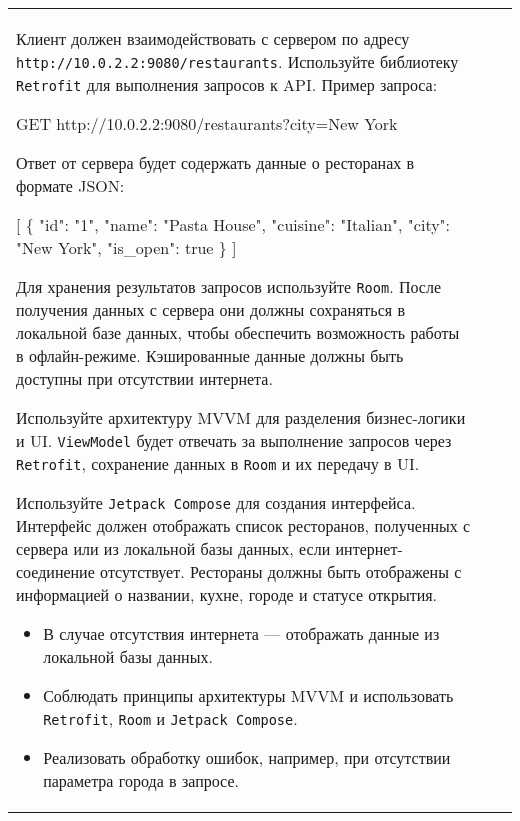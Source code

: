 \documentclass[a4paper]{article}
\begin{document}
\begin{tabular}{!{\vrule width 2pt}p{5cm}|p{6cm}|p{4cm}!{\vrule width 2pt}}
{\begin{minipage}{16cm}
\begin{enumerate}
Клиент должен взаимодействовать с сервером по адресу \texttt{http://10.0.2.2:9080/restaurants}. Используйте библиотеку \texttt{Retrofit} для выполнения запросов к API. Пример запроса:


GET http://10.0.2.2:9080/restaurants?city=New York


Ответ от сервера будет содержать данные о ресторанах в формате JSON:


[
  \{
    "id": "1",
    "name": "Pasta House",
    "cuisine": "Italian",
    "city": "New York",
    "is\_open": true
  \}
]


Для хранения результатов запросов используйте \texttt{Room}. После получения данных с сервера они должны сохраняться в локальной базе данных, чтобы обеспечить возможность работы в офлайн-режиме. Кэшированные данные должны быть доступны при отсутствии интернета.

Используйте архитектуру MVVM для разделения бизнес-логики и UI. \texttt{ViewModel} будет отвечать за выполнение запросов через \texttt{Retrofit}, сохранение данных в \texttt{Room} и их передачу в UI.

Используйте \texttt{Jetpack Compose} для создания интерфейса. Интерфейс должен отображать список ресторанов, полученных с сервера или из локальной базы данных, если интернет-соединение отсутствует. Рестораны должны быть отображены с информацией о названии, кухне, городе и статусе открытия.

\begin{itemize}
  \item В случае отсутствия интернета — отображать данные из локальной базы данных.
  \item Соблюдать принципы архитектуры MVVM и использовать \texttt{Retrofit}, \texttt{Room} и \texttt{Jetpack Compose}.
  \item Реализовать обработку ошибок, например, при отсутствии параметра города в запросе.
\end{itemize} 
\end{enumerate}


\end{minipage}}
\end{tabular}
\end{document}
